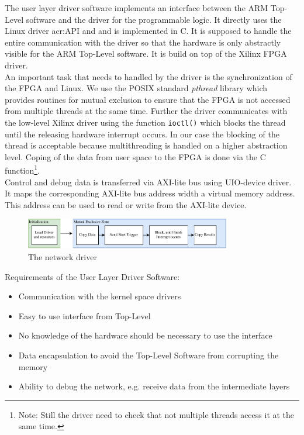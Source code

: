 The user layer driver software implements an interface between the ARM Top-Level software and the driver for the programmable logic. It directly uses the Linux driver \gls{acr:API} and and is implemented in C. It is supposed to handle the entire communication with the driver so that the hardware is only abstractly visible for the ARM Top-Level software. It is build on top of the Xilinx FPGA driver. \\
\noindent
An important task that needs to handled by the driver is the synchronization of the FPGA and Linux. We use the POSIX standard \emph{pthread} library which provides routines for mutual exclusion to ensure that the FPGA is not accessed from multiple threads at the same time. Further the driver communicates with the low-level Xilinx driver using the function \texttt{ioctl()} which blocks the thread until the releasing hardware interrupt occurs. In our case the blocking of the thread is acceptable because multithreading is handled on a higher abstraction level. Coping of the data from user space to the FPGA is done via the C function\footnote{Note: Still the driver need to check that not multiple threads access it at the same time.}. \\
Control and debug data is transferred via AXI-lite bus using UIO-device driver. It maps the corresponding AXI-lite bus address width a virtual memory address. This address can be used to read or write from the AXI-lite device. 



\begin{figure}[hbt]
  \centering
  \includegraphics[width=0.8\textwidth]{img/eggdriver}
  \caption{The network driver}
  \label{fig:sw-python-eggdriver-build}
\end{figure}

Requirements of the User Layer Driver Software:
\begin{itemize} 
	\item Communication with the kernel space drivers 
	\item Easy to use interface from Top-Level 
	\item No knowledge of the hardware should be necessary to use the interface
	\item Data encapsulation to avoid the Top-Level Software from corrupting the memory 
	\item Ability to debug the network, e.g. receive data from the intermediate layers
\end{itemize}

